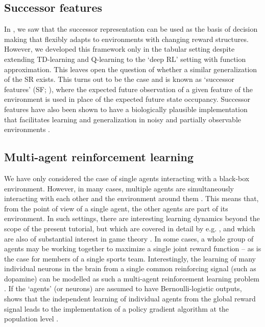 \subsection{Successor features}
\label{sec:SFs}
In , we saw that the successor representation can be used as the basis of decision making that flexibly adapts to environments with changing reward structures.
However, we developed this framework only in the tabular setting despite extending TD-learning and Q-learning to the `deep RL' setting with function approximation.
This leaves open the question of whether a similar generalization of the SR exists.
This turns out to be the case and is known as `successor features' (SF; \citealp{barreto2017successor}), where the expected future observation of a given feature of the environment is used in place of the expected future state occupancy.
Successor features have also been shown to have a biologically plausible implementation that facilitates learning and generalization in noisy and partially observable environments \citep{vertes2019neurally}.



\subsection{Multi-agent reinforcement learning}
\label{sec:multi-agent}
We have only considered the case of single agents interacting with a black-box environment.
However, in many cases, multiple agents are simultaneously interacting with each other and the environment around them \citep{gronauer2022multi}.
This means that, from the point of view of a single agent, the other agents are part of its environment.
In such settings, there are interesting learning dynamics beyond the scope of the present tutorial, but which are covered in detail by e.g. \citet{gronauer2022multi}, and which are also of substantial interest in game theory \citep{nowe2012game}.
In some cases, a whole group of agents may be working together to maximize a single joint reward function -- as is the case for members of a single sports team.
Interestingly, the learning of many individual neurons in the brain from a single common reinforcing signal (such as dopamine) can be modelled as such a multi-agent reinforcement learning problem \citep{sutton2018reinforcement}.
If the `agents' (or neurons) are assumed to have Bernoulli-logistic outputs, \citet{williams1992simple} shows that the independent learning of individual agents from the global reward signal leads to the implementation of a policy gradient algorithm at the population level \citep{sutton2018reinforcement}.
